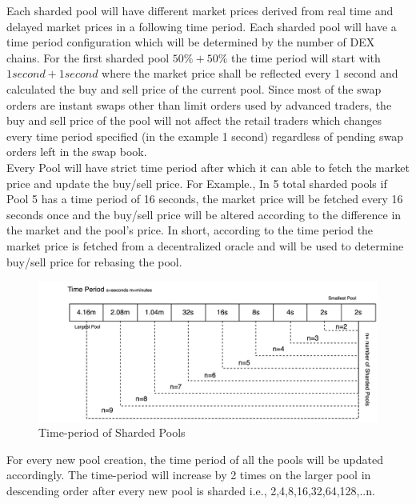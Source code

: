 \documentclass[10pt]{article}
\begin{document}
Each sharded pool will have different market prices derived from real time and delayed market prices in a following time period. Each sharded pool will have a time period configuration which will be determined by the number of DEX chains. For the first sharded pool $50\% + 50\%$ the time period will start with $1 second + 1 second$ where the market price shall be reflected every 1 second and calculated the buy and sell price of the current pool. Since most of the swap orders are instant swaps other than limit orders used by advanced traders, the buy and sell price of the pool will not affect the retail traders which changes every time period specified (in the example 1 second) regardless of pending swap orders left in the swap book.\\

Every Pool will have strict time period after which it can able to fetch the market price and update the buy/sell price. For Example., In 5 total sharded pools if Pool 5 has a time period of 16 seconds, the market price will be fetched every 16 seconds once and the buy/sell price will be altered according to the difference in the market and the pool's price. In short, according to the time period the market price is fetched from a decentralized oracle and will be used to determine buy/sell price for rebasing the pool. \\



\begin{figure}[H]
\begin{center}
\includegraphics[width=\textwidth]{timeperiod-pools}
\caption{Time-period of Sharded Pools}
\end{center}
\end{figure}

For every new pool creation, the time period of all the pools will be updated accordingly. The time-period will increase by 2 times on the larger pool in descending order after every new pool is sharded i.e., 2,4,8,16,32,64,128,..n. 
\end{document}
